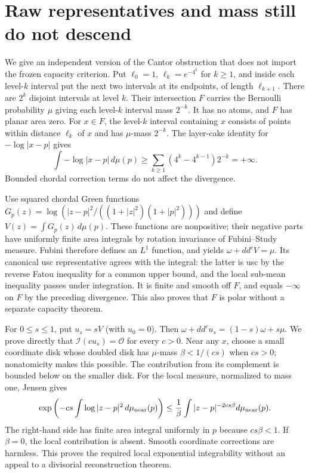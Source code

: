 \documentclass[11pt]{article}
\newcommand{\I}{\mathcal I}
\newcommand{\OO}{\mathcal O}
\theoremstyle{definition}
\begin{document}
\section{Raw representatives and mass still do not descend}\label{sec:cantor}
We give an independent version of the Cantor obstruction that does
not import the frozen capacity criterion. Put $\ell_0=1$,
$\ell_k=e^{-4^k}$ for $k\geq1$, and inside each level-$k$
interval put the next two intervals at its endpoints, of length
$\ell_{k+1}$. There are $2^k$ disjoint intervals at level $k$.
Their intersection $F$ carries the Bernoulli probability $\mu$
giving each level-$k$ interval mass $2^{-k}$. It has no atoms,
and $F$ has planar area zero. For $x\in F$, the level-$k$
interval containing $x$ consists of points within distance
$\ell_k$ of $x$ and has $\mu$-mass $2^{-k}$. The layer-cake
identity for $-\log|x-p|$ gives
\[
 \int-\log|x-p|\,d\mu(p)
 \geq\sum_{k\geq1}(4^k-4^{k-1})2^{-k}=+\infty.
\]
Bounded chordal correction terms do not affect the divergence.

Use squared chordal Green functions
$G_p(z)=\log(|z-p|^2/((1+|z|^2)(1+|p|^2)))$ and define
$V(z)=\int G_p(z)\,d\mu(p)$. These functions are nonpositive;
their negative parts have uniformly finite area integrals by
rotation invariance of Fubini--Study measure. Fubini therefore
defines an $L^1$ function, and yields
$\omega+dd^cV=\mu$. Its canonical usc representative agrees
with the integral: the latter is usc by the reverse Fatou inequality
for a common upper bound, and the local sub-mean inequality passes
under integration. It is finite and smooth off $F$, and equals
$-\infty$ on $F$ by the preceding divergence. This also proves
that $F$ is polar without a separate capacity theorem.

For $0\leq s\leq1$, put $u_s=sV$ (with $u_0=0$).
Then $\omega+dd^cu_s=(1-s)\omega+s\mu$. We prove directly that
$\I(cu_s)=\OO$ for every $c>0$. Near any $x$, choose a small
coordinate disk whose doubled disk has $\mu$-mass
$\beta<1/(cs)$ when $cs>0$; nonatomicity makes this possible.
The contribution from its complement is bounded below on the
smaller disk. For the local measure, normalized to mass one,
Jensen gives
\[
 \exp\left(-cs\int\log|z-p|^2\,d\mu_{\rm near}(p)\right)
 \leq\frac1\beta\int|z-p|^{-2cs\beta}
                         d\mu_{\rm near}(p).
\]
The right-hand side has finite area integral uniformly in $p$
because $cs\beta<1$. If $\beta=0$, the local contribution is
absent. Smooth coordinate corrections are harmless. This proves
the required local exponential integrability without an appeal
to a divisorial reconstruction theorem.
\end{document}
